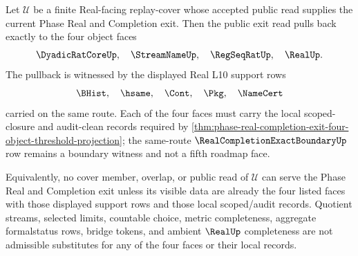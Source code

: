 \begin{theorem}
\label{thm:real-l10-route-cover-phase-exit-converse}
Let $\mathcal{U}$ be a finite Real-facing replay-cover whose accepted public
read supplies the current Phase Real and Completion exit. Then the public exit
read pulls back exactly to the four object faces
$$
\DyadicRatCoreUp,\quad \StreamNameUp,\quad \RegSeqRatUp,\quad \RealUp.
$$
The pullback is witnessed by the displayed Real L10 support rows
$$
\BHist,\quad \hsame,\quad \Cont,\quad \Pkg,\quad \NameCert
$$
carried on the same route. Each of the four faces must carry the local
scoped-closure and audit-clean records required by
\autoref{thm:phase-real-completion-exit-four-object-threshold-projection};
the same-route $\RealCompletionExactBoundaryUp$ row remains a boundary witness
and not a fifth roadmap face.

Equivalently, no cover member, overlap, or public read of $\mathcal{U}$ can
serve the Phase Real and Completion exit unless its visible data are already
the four listed faces with those displayed support rows and those local
scoped/audit records. Quotient streams, selected limits, countable choice,
metric completeness, aggregate formalstatus rows, bridge tokens, and ambient
$\RealUp$ completeness are not admissible substitutes for any of the four
faces or their local records.
\end{theorem}
